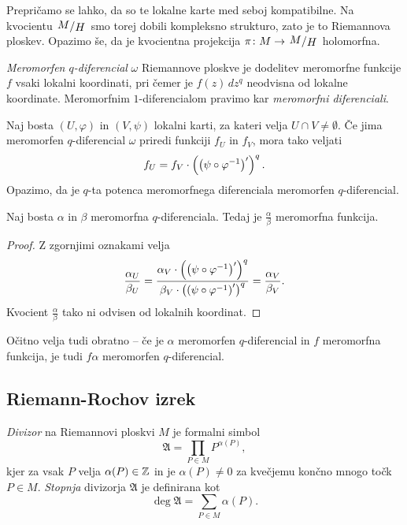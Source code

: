 Prepričamo se lahko, da so te lokalne karte med seboj kompatibilne.
Na kvocientu $\kvoc{M}{H}$ smo torej dobili kompleksno strukturo,
zato je to Riemannova ploskev. Opazimo še, da je kvocientna
projekcija $\pi \colon M \to \kvoc{M}{H}$ holomorfna.

\begin{definicija}
\emph{Meromorfen $q$-diferencial} $\omega$ Riemannove ploskve je
dodelitev meromorfne funkcije $f$ vsaki lokalni koordinati, pri
čemer je $f(z)\,dz^q$ neodvisna od lokalne koordinate. Meromorfnim
$1$-diferencialom pravimo kar \emph{meromorfni diferenciali}.
\end{definicija}

Naj bosta $(U, \varphi)$ in $(V, \psi)$ lokalni karti, za kateri
velja $U \cap V \ne \emptyset$. Če jima meromorfen $q$-diferencial
$\omega$ priredi funkciji $f_U$ in $f_V$, mora tako veljati
\[
f_U = f_V \cdot \left(\left(\psi \circ \varphi^{-1}\right)'\right)^q.
\]
Opazimo, da je $q$-ta potenca meromorfnega diferenciala meromorfen
$q$-diferencial.

\begin{trditev}
Naj bosta $\alpha$ in $\beta$ meromorfna $q$-diferenciala. Tedaj je
$\frac{\alpha}{\beta}$ meromorfna funkcija.
\end{trditev}

\begin{proof}
Z zgornjimi oznakami velja
\[
\frac{\alpha_U}{\beta_U} =
\frac{\alpha_V \cdot \left(\left(\psi \circ \varphi^{-1}\right)'\right)^q}
{\beta_V \cdot \left(\left(\psi \circ \varphi^{-1}\right)'\right)^q} =
\frac{\alpha_V}{\beta_V}.
\]
Kvocient $\frac{\alpha}{\beta}$ tako ni odvisen od lokalnih
koordinat.
\end{proof}

Očitno velja tudi obratno -- če je $\alpha$ meromorfen
$q$-diferencial in $f$ meromorfna funkcija, je tudi $f \alpha$
meromorfen $q$-diferencial.

\subsection{Riemann-Rochov izrek}

\begin{definicija}
\emph{Divizor} na Riemannovi ploskvi $M$ je formalni simbol
\[
\mathfrak{A} = \prod_{P \in M} P^{\alpha(P)},
\]
kjer za vsak $P$ velja $\alpha(P) \in \mathbb{Z}$ in je $\alpha(P) \ne 0$
za kvečjemu končno mnogo točk $P \in M$. \emph{Stopnja} divizorja
$\mathfrak{A}$ je definirana kot
\[
\deg \mathfrak{A} = \sum_{P \in M} \alpha(P).
\]
\end{definicija}

